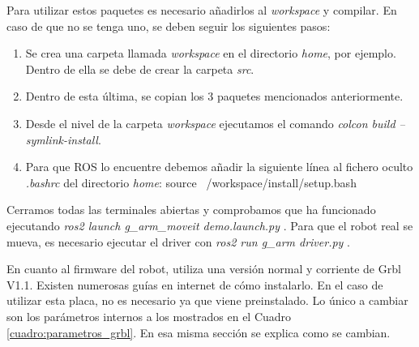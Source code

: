 \newpage
Para utilizar estos paquetes es necesario añadirlos al \textit{workspace} y compilar. En caso de que no se tenga uno, 
se deben seguir los siguientes pasos: 
\begin{enumerate}
\item Se crea una carpeta llamada \textit{workspace} en el directorio \textit{home}, por ejemplo. Dentro de ella 
se debe de crear la carpeta \textit{src}. 
\item Dentro de esta última, se copian los 3 paquetes mencionados anteriormente.
\item Desde el nivel de la carpeta \textit{workspace} ejecutamos el comando \textit{colcon build --symlink-install}.
\item Para que ROS lo encuentre debemos añadir la siguiente línea al fichero oculto \textit{.bashrc} del directorio \textit{home}:
source ~/workspace/install/setup.bash

\end{enumerate}
Cerramos todas las terminales abiertas y comprobamos que ha funcionado ejecutando \textit{ros2 launch g\_arm\_moveit demo.launch.py} . Para que el 
robot real se mueva, es necesario ejecutar el driver con \textit{ros2 run g\_arm driver.py} .


En cuanto al firmware del robot, utiliza una versión normal y corriente de Grbl V1.1. Existen numerosas guías en internet de 
cómo instalarlo. En el caso de utilizar esta placa, no es necesario ya que viene preinstalado. Lo único a cambiar son los 
parámetros internos a los mostrados en el Cuadro \ref{cuadro:parametros_grbl}. En esa misma sección se explica como se cambian.

